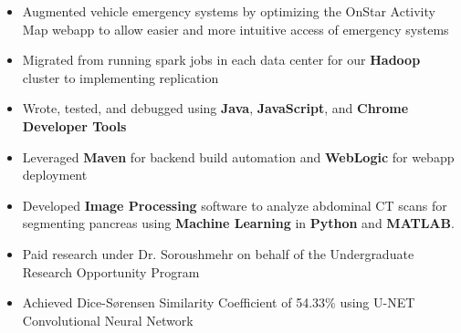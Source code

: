 \documentclass[10pt,a4paper,ragged2e]{altacv}
\begin{document}
\divider

\begin{itemize}
\item Augmented vehicle emergency systems by optimizing the OnStar Activity Map webapp to allow easier and more intuitive access of emergency systems
\smallskip
\item Migrated from running spark jobs in each data center for our \textbf{Hadoop} cluster to implementing replication
\smallskip
\item Wrote, tested, and debugged using \textbf{Java}, \textbf{JavaScript}, and \textbf{Chrome Developer Tools}
\smallskip
\item Leveraged \textbf{Maven} for backend build automation and \textbf{WebLogic} for webapp deployment
\end{itemize}

\divider

\begin{itemize}
\item Developed \textbf{Image Processing} software to analyze abdominal CT scans for segmenting pancreas using \textbf{Machine Learning} in \textbf{Python} and \textbf{MATLAB}.
\smallskip
\item Paid research under Dr. Soroushmehr on behalf of the Undergraduate Research Opportunity Program
\smallskip
\item Achieved Dice-Sørensen Similarity Coefficient of 54.33\% using U-NET Convolutional Neural Network
\end{itemize}

\clearpage

\nocite{*}
\end{document}
